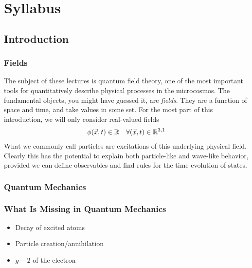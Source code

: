 \documentclass[12pt]{article}
\begin{document}




\section{Syllabus}

\subsection{Introduction}

\subsubsection{Fields}

The subject of these lectures is quantum field theory, one of the most
important tools for quantitatively describe physical processes in the
microcosmos. The fundamental objects, you might have guessed it, are
\emph{fields}. They are a function of space and time, and take values
in some set. For the most part of this introduction, we will only
consider real-valued fields
\begin{equation}
  \phi(\vec x, t) \in {\mathbb{R}}
  \quad \forall (\vec x, t) \in {\mathbb{R}}^{3,1}  
\end{equation}
What we commonly call particles are excitations of this underlying
physical field. Clearly this has the potential to explain both
particle-like and wave-like behavior, provided we can define
observables and find rules for the time evolution of states.



\subsubsection{Quantum Mechanics}





\subsubsection{What Is Missing in Quantum Mechanics}

\begin{itemize}
\item Decay of excited atoms
\item Particle creation/annihilation
\item $g-2$ of the electron
\end{itemize}
\end{document}
